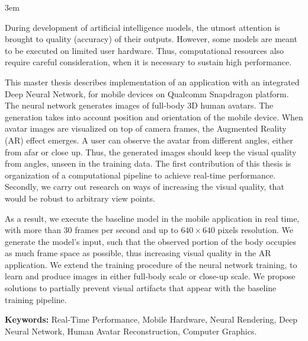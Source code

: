 \emergencystretch 3em

\par
During development of artificial intelligence models, the utmost attention is brought to quality (accuracy) of their outputs. However, some models are meant to be executed on limited user hardware. Thus, computational resources also require careful consideration, when it is necessary to sustain high performance.

\par
This master thesis describes implementation of an application with an integrated Deep Neural Network, for mobile devices on Qualcomm Snapdragon platform. The neural network generates images of full-body 3D human avatars. The generation takes into account position and orientation of the mobile device. When avatar images are visualized on top of camera frames, the Augmented Reality (AR) effect emerges. A user can observe the avatar from different angles, either from afar or close up. Thus, the generated images should keep the visual quality from angles, unseen in the training data. The first contribution of this thesis is organization of a computational pipeline to achieve real-time performance. Secondly, we carry out research on ways of increasing the visual quality, that would be robust to arbitrary view points.

\par
As a result, we execute the baseline model \cite{dnn:stylepeople21} in the mobile application in real time, with more than 30 frames per second and up to $640\times640$ pixels resolution. We generate the model's input, such that the observed portion of the body occupies as much frame space as possible, thus increasing visual quality in the AR application. We extend the training procedure of the neural network training, to learn and produce images in either full-body scale or close-up scale. We propose solutions to partially prevent visual artifacts that appear with the baseline training pipeline. 

\par
\textbf{Keywords:} Real-Time Performance, Mobile Hardware, Neural Rendering, Deep Neural Network, Human Avatar Reconstruction, Computer Graphics.  
